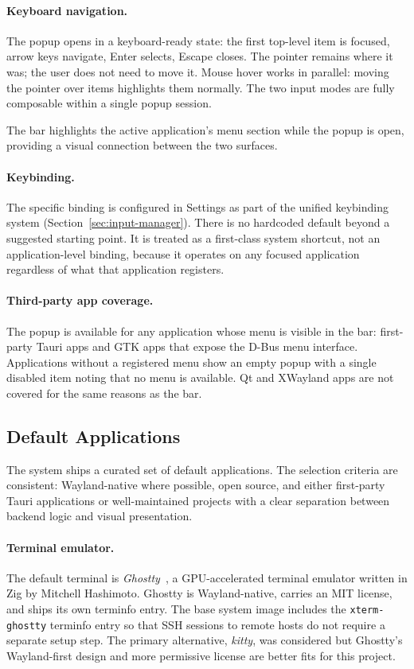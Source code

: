 \paragraph{Keyboard navigation.}
The popup opens in a keyboard-ready state: the first top-level item is
focused, arrow keys navigate, Enter selects, Escape closes. The pointer
remains where it was; the user does not need to move it. Mouse hover works
in parallel: moving the pointer over items highlights them normally. The
two input modes are fully composable within a single popup session.

The bar highlights the active application's menu section while the popup is
open, providing a visual connection between the two surfaces.

\paragraph{Keybinding.}
The specific binding is configured in Settings as part of the unified keybinding
system (Section~\ref{sec:input-manager}). There is no hardcoded default beyond
a suggested starting point. It is treated as a first-class system shortcut,
not an application-level binding, because it operates on any focused
application regardless of what that application registers.

\paragraph{Third-party app coverage.}
The popup is available for any application whose menu is visible in the bar:
first-party Tauri apps and GTK apps that expose the D-Bus menu interface.
Applications without a registered menu show an empty popup with a single
disabled item noting that no menu is available. Qt and XWayland apps are
not covered for the same reasons as the bar.

\subsection{Default Applications}
\label{sec:default-apps}

The system ships a curated set of default applications. The selection
criteria are consistent: Wayland-native where possible, open source,
and either first-party Tauri applications or well-maintained projects
with a clear separation between backend logic and visual presentation.

\paragraph{Terminal emulator.}
The default terminal is \emph{Ghostty}~\cite{ghostty}, a GPU-accelerated
terminal emulator written in Zig by Mitchell Hashimoto. Ghostty is
Wayland-native, carries an MIT license, and ships its own terminfo entry.
The base system image includes the \texttt{xterm-ghostty} terminfo entry
so that SSH sessions to remote hosts do not require a separate setup step.
The primary alternative, \emph{kitty}, was considered but Ghostty's
Wayland-first design and more permissive license are better fits for
this project.

